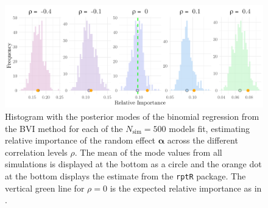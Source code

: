 \begin{figure}[ht]
  \centering
    \includegraphics[width=1\linewidth]{Figures/Simulation study/Random_logit.png}
    \caption[Relative importance of the random effect $\boldsymbol{\alpha}$ in binomial GLMM]{Histogram with the posterior modes of the binomial regression from the BVI method for each of the $N_{\text{sim}}=500$ models fit, estimating relative importance of the random effect $\boldsymbol{\alpha}$ across the different correlation levels $\rho$. The mean of the mode values from all simulations is displayed at the bottom as a circle and the orange dot at the bottom displays the estimate from the \texttt{rptR} package. The vertical green line for $\rho=0$ is the expected relative importance as in .}
    \label{fig:relimp_random_logit}
\end{figure}
